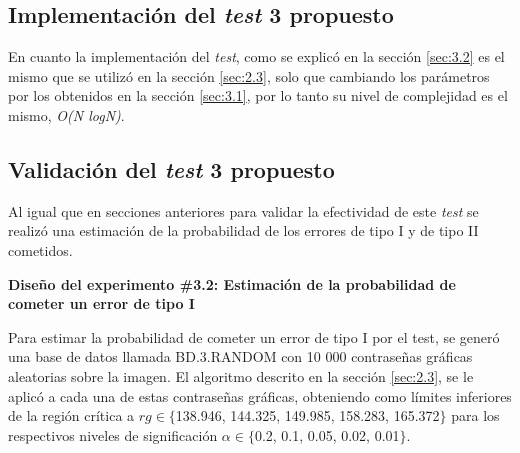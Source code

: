 \documentclass[12pt]{report}
\begin{document}
\subsection{Implementación del \textit{test} 3 propuesto }
\label{sec:3.3}

En cuanto  la implementación del \textit{test}, como se explicó en la sección \ref{sec:3.2} es el mismo que se utilizó en la sección \ref{sec:2.3}, solo que cambiando los parámetros por los obtenidos en la sección \ref{sec:3.1}, por lo tanto su nivel de complejidad es el mismo, \textit{O(N logN)}.

%	
%	

\subsection{Validación del \textit{test} 3 propuesto}
\label{sec:3.4}


Al igual que en secciones anteriores para validar la efectividad de este \textit{test} se realizó una estimación de la probabilidad de los errores de tipo I y de tipo II cometidos.
	 
\textbf{Diseño del experimento \#3.2: Estimación de la probabilidad de cometer un error de tipo I} 

Para estimar la probabilidad de cometer un error de tipo I por el test, se generó una base de datos llamada BD.3.RANDOM con 10 000 contraseñas gráficas aleatorias sobre la imagen. El algoritmo descrito en la sección \ref{sec:2.3}, se le aplicó a cada una de estas contraseñas gráficas, obteniendo como límites inferiores de la región crítica a $rg \in \{$138.946, 144.325, 149.985, 158.283, 165.372$\}$  para los respectivos  niveles de significación $\alpha \in \{$0.2, 0.1, 0.05, 0.02, 0.01$\}$.
\end{document}
